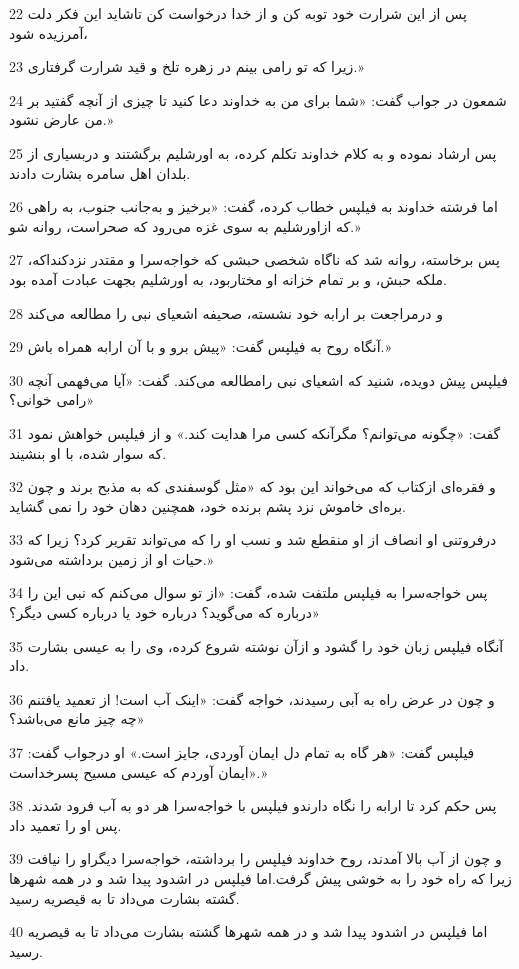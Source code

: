 \par 22 پس از این شرارت خود توبه کن و از خدا درخواست کن تاشاید این فکر دلت آمرزیده شود،
\par 23 زیرا که تو رامی بینم در زهره تلخ و قید شرارت گرفتاری.»
\par 24 شمعون در جواب گفت: «شما برای من به خداوند دعا کنید تا چیزی از آنچه گفتید بر من عارض نشود.»
\par 25 پس ارشاد نموده و به کلام خداوند تکلم کرده، به اورشلیم برگشتند و دربسیاری از بلدان اهل سامره بشارت دادند.
\par 26 اما فرشته خداوند به فیلپس خطاب کرده، گفت: «برخیز و به‌جانب جنوب، به راهی که ازاورشلیم به سوی غزه می‌رود که صحراست، روانه شو.»
\par 27 پس برخاسته، روانه شد که ناگاه شخصی حبشی که خواجه‌سرا و مقتدر نزدکنداکه، ملکه حبش، و بر تمام خزانه او مختاربود، به اورشلیم بجهت عبادت آمده بود.
\par 28 و درمراجعت بر ارابه خود نشسته، صحیفه اشعیای نبی را مطالعه می‌کند
\par 29 آنگاه روح به فیلپس گفت: «پیش برو و با آن ارابه همراه باش.»
\par 30 فیلپس پیش دویده، شنید که اشعیای نبی رامطالعه می‌کند. گفت: «آیا می‌فهمی آنچه رامی خوانی؟»
\par 31 گفت: «چگونه می‌توانم؟ مگرآنکه کسی مرا هدایت کند.» و از فیلپس خواهش نمود که سوار شده، با او بنشیند.
\par 32 و فقره‌ای ازکتاب که می‌خواند این بود که «مثل گوسفندی که به مذبح برند و چون بره‌ای خاموش نزد پشم برنده خود، همچنین دهان خود را نمی گشاید.
\par 33 درفروتنی او انصاف از او منقطع شد و نسب او را که می‌تواند تقریر کرد؟ زیرا که حیات او از زمین برداشته می‌شود.»
\par 34 پس خواجه‌سرا به فیلپس ملتفت شده، گفت: «از تو سوال می‌کنم که نبی این را درباره که می‌گوید؟ درباره خود یا درباره کسی دیگر؟»
\par 35 آنگاه فیلپس زبان خود را گشود و ازآن نوشته شروع کرده، وی را به عیسی بشارت داد.
\par 36 و چون در عرض راه به آبی رسیدند، خواجه گفت: «اینک آب است! از تعمید یافتنم چه چیز مانع می‌باشد؟»
\par 37 فیلپس گفت: «هر گاه به تمام دل ایمان آوردی، جایز است.» او درجواب گفت: «ایمان آوردم که عیسی مسیح پسرخداست.»
\par 38 پس حکم کرد تا ارابه را نگاه دارندو فیلپس با خواجه‌سرا هر دو به آب فرود شدند. پس او را تعمید داد.
\par 39 و چون از آب بالا آمدند، روح خداوند فیلپس را برداشته، خواجه‌سرا دیگراو را نیافت زیرا که راه خود را به خوشی پیش گرفت.اما فیلپس در اشدود پیدا شد و در همه شهرها گشته بشارت می‌داد تا به قیصریه رسید.
\par 40 اما فیلپس در اشدود پیدا شد و در همه شهرها گشته بشارت می‌داد تا به قیصریه رسید.


